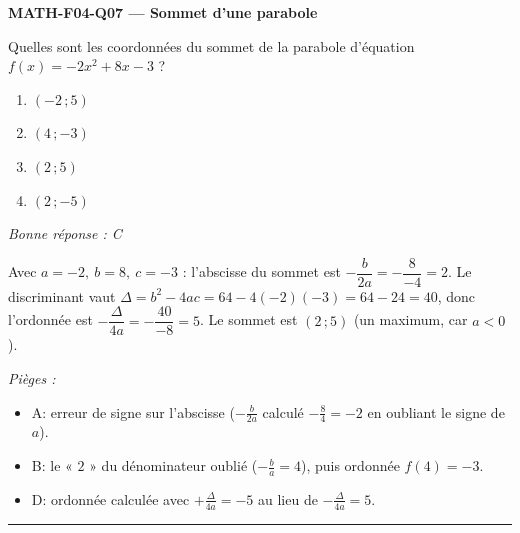 \documentclass[11pt,a4paper]{article}
\begin{document}
\noindent\textbf{MATH-F04-Q07 --- Sommet d'une parabole}\par
Quelles sont les coordonnées du sommet de la parabole d'équation $f(x)=-2x^2+8x-3$ ?
\begin{enumerate}[label=\Alph*)]
\item $(-2\,;5)$
\item $(4\,;-3)$
\item $(2\,;5)$
\item $(2\,;-5)$
\end{enumerate}
\textit{Bonne réponse : C}\par
Avec $a=-2,\ b=8,\ c=-3$ : l'abscisse du sommet est $-\dfrac{b}{2a}=-\dfrac{8}{-4}=2$. Le discriminant vaut $\Delta=b^2-4ac=64-4(-2)(-3)=64-24=40$, donc l'ordonnée est $-\dfrac{\Delta}{4a}=-\dfrac{40}{-8}=5$. Le sommet est $(2\,;5)$ (un maximum, car $a<0$).\par
\textit{Pièges :}
\begin{itemize}
\item A: erreur de signe sur l'abscisse ($-\tfrac{b}{2a}$ calculé $-\tfrac{8}{4}=-2$ en oubliant le signe de $a$).
\item B: le « $2$ » du dénominateur oublié ($-\tfrac{b}{a}=4$), puis ordonnée $f(4)=-3$.
\item D: ordonnée calculée avec $+\tfrac{\Delta}{4a}=-5$ au lieu de $-\tfrac{\Delta}{4a}=5$.
\end{itemize}
\vspace{8pt}\hrule\vspace{8pt}
\end{document}
